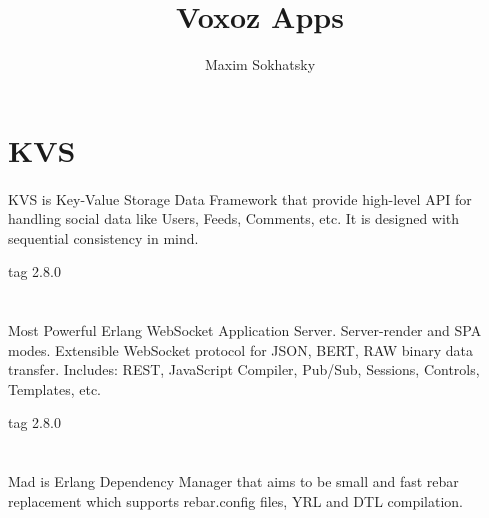 \documentclass[11pt]{article}
\begin{document}
\title{Voxoz Apps}
\author{Maxim Sokhatsky}


\section*{KVS}
\paragraph{}
KVS is Key-Value Storage Data Framework that provide high-level API for handling
social data like Users, Feeds, Comments, etc. It is designed with sequential consistency in mind.

 tag 2.8.0


\section*{}

\paragraph{}
Most Powerful Erlang WebSocket Application Server. Server-render and SPA modes.
Extensible WebSocket protocol for JSON, BERT, RAW binary data transfer.
Includes: REST, JavaScript Compiler, Pub/Sub, Sessions, Controls, Templates, etc.

 tag 2.8.0

\section*{}

\paragraph{}
Mad is Erlang Dependency Manager that aims to be small and fast rebar
replacement which supports rebar.config files, YRL and DTL compilation.
\end{document}
